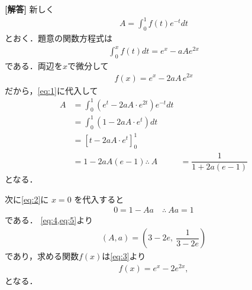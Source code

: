 \documentclass[../../main.tex]{subfiles}
\begin{document}
\begin{oframed}
  
\end{oframed}

{\bf [解答]}
新しく
\begin{align}
  A=\displaystyle\int_0^1 f(t)e^{-t}dt \label{eq:1}
\end{align}
とおく．題意の関数方程式は
\begin{align}
  \int_{0}^{x} f(t)dt = e^x -aAe^{2x} \label{eq:2}
\end{align}
である．両辺を$x$で微分して
\begin{align}
  f(x)=e^x-2aA\,e^{2x}  \label{eq:3}
\end{align}
だから，\cref{eq:1}に代入して
\begin{align}
  A
  &=\int_0^1(e^t-2aA\cdot e^{2t})e^{-t}dt \\
  &=\int_0^1(1-2aA\cdot e^t)dt \\
  &=\left[t-2aA\cdot e^t\right]_0^1 \\
  &=1-2aA(e-1)
  \therefore\
  A
  &=\dfrac{1}{1+2a(e-1)} \label{eq:4}
\end{align}
となる．

次に\cref{eq:2}に $x=0$ を代入すると
\begin{align}
  0=1-Aa \quad \therefore\ Aa=1 \label{eq:5}
\end{align}
である．
\cref{eq:4,eq:5}より
\begin{align}
  (A,a)=\left(3-2e,\ \dfrac{1}{3-2e}\right)
\end{align}
であり，求める関数$f(x)$は\cref{eq:3}より
\begin{align}
  f(x)=e^x-2e^{2x},
\end{align}
となる．

\newpage
\end{document}

